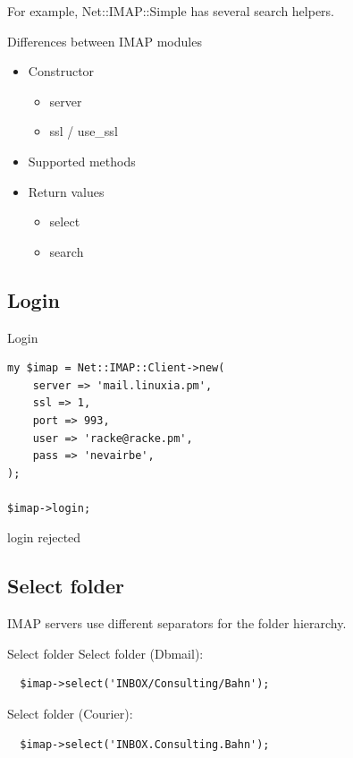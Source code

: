 For example, Net::IMAP::Simple has several search helpers.

\begin{frame}[fragile]{Differences between IMAP modules}
  \begin{itemize}
  \item Constructor
    \begin{itemize}
      \item server
      \item ssl / use\_ssl
    \end{itemize}
  \item Supported methods
  \item Return values
    \begin{itemize}
    \item select
      \item search
    \end{itemize}
  \end{itemize}
\end{frame}

\subsection{Login}

\begin{frame}[fragile]{Login}
\begin{verbatim}
my $imap = Net::IMAP::Client->new(
    server => 'mail.linuxia.pm',
    ssl => 1,
    port => 993,
    user => 'racke@racke.pm',
    pass => 'nevairbe',
);

$imap->login;
\end{verbatim}
\end{frame}

login rejected

\subsection{Select folder}

IMAP servers use different separators for the folder hierarchy.

\begin{frame}[fragile]{Select folder}
  Select folder (Dbmail):

\begin{verbatim}
  $imap->select('INBOX/Consulting/Bahn');
\end{verbatim}

  Select folder (Courier):

\begin{verbatim}
  $imap->select('INBOX.Consulting.Bahn');
\end{verbatim}

\end{frame}

